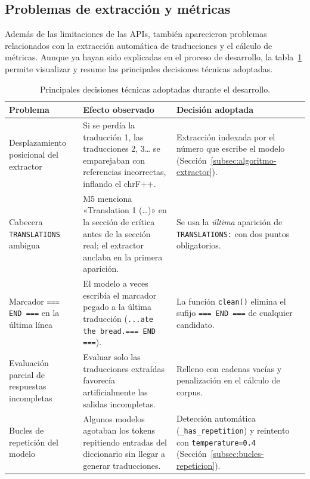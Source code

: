 \subsection{Problemas de extracción y métricas}
\label{subsec:problemas-metricas}

Además de las limitaciones de las APIs, también aparecieron problemas relacionados con la extracción automática de traducciones y el cálculo de métricas. Aunque ya hayan sido explicadas en el proceso de desarrollo, la tabla~\ref{tab:decisiones-tecnicas} permite visualizar y resume las principales decisiones técnicas adoptadas.

\begin{table}[ht]
	\centering
	\caption{Principales decisiones técnicas adoptadas durante el desarrollo.}
	\label{tab:decisiones-tecnicas}
	\begin{tabularx}{\textwidth}{p{3.6cm} X X}
		\toprule
		\textbf{Problema} & \textbf{Efecto observado} & \textbf{Decisión adoptada} \\
		\midrule
		
		Desplazamiento posicional del extractor
		& Si se perdía la traducción 1, las traducciones 2, 3… se emparejaban con referencias incorrectas, inflando el chrF++.
		& Extracción indexada por el número que escribe el modelo (Sección~\ref{subsec:algoritmo-extractor}). \\
		\midrule
		
		Cabecera \texttt{TRANSLATIONS} ambigua
		& M5 menciona «Translation 1 (\ldots)» en la sección de crítica antes de la sección real; el extractor anclaba en la primera aparición.
		& Se usa la \emph{última} aparición de \texttt{TRANSLATIONS:} con dos puntos obligatorios. \\
		\midrule
		
		Marcador \texttt{=== END ===} en la última línea
		& El modelo a veces escribía el marcador pegado a la última traducción (\texttt{...ate the bread.=== END ===}).
		& La función \texttt{clean()} elimina el sufijo \texttt{=== END ===} de cualquier candidato. \\
		\midrule
		
		Evaluación parcial de respuestas incompletas
		& Evaluar solo las traducciones extraídas favorecía artificialmente las salidas incompletas.
		& Relleno con cadenas vacías y penalización en el cálculo de corpus. \\
		\midrule
			
		Bucles de repetición del modelo
		& Algunos modelos agotaban los tokens repitiendo entradas del diccionario sin llegar a generar traducciones.
		& Detección automática (\texttt{\_has\_repetition}) y reintento con \texttt{temperature=0.4} (Sección~\ref{subsec:bucles-repeticion}). \\
		
		\bottomrule
	\end{tabularx}
\end{table}

